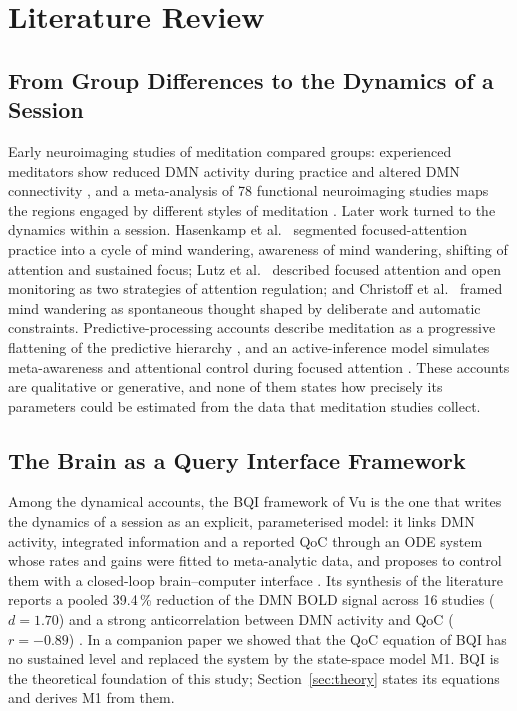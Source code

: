 \section{Literature Review}
\label{sec:litreview}

\subsection{From Group Differences to the Dynamics of a Session}
Early neuroimaging studies of meditation compared groups: experienced meditators show reduced DMN activity during practice and altered DMN connectivity \cite{Brewer2011,Garrison2015}, and a meta-analysis of 78 functional neuroimaging studies maps the regions engaged by different styles of meditation \cite{Fox2016}. Later work turned to the dynamics within a session. Hasenkamp et al.\ \cite{Hasenkamp2012} segmented focused-attention practice into a cycle of mind wandering, awareness of mind wandering, shifting of attention and sustained focus; Lutz et al.\ \cite{Lutz2008} described focused attention and open monitoring as two strategies of attention regulation; and Christoff et al.\ \cite{Christoff2016} framed mind wandering as spontaneous thought shaped by deliberate and automatic constraints. Predictive-processing accounts describe meditation as a progressive flattening of the predictive hierarchy \cite{Laukkonen2021}, and an active-inference model simulates meta-awareness and attentional control during focused attention \cite{SandvedSmith2021}. These accounts are qualitative or generative, and none of them states how precisely its parameters could be estimated from the data that meditation studies collect.

\subsection{The Brain as a Query Interface Framework}
Among the dynamical accounts, the BQI framework of Vu \cite{BQI} is the one that writes the dynamics of a session as an explicit, parameterised model: it links DMN activity, integrated information and a reported QoC through an ODE system whose rates and gains were fitted to meta-analytic data, and proposes to control them with a closed-loop brain--computer interface \cite[Sec.~7, 9 and 10]{BQI}. Its synthesis of the literature reports a pooled 39.4\,\% reduction of the DMN BOLD signal across 16 studies ($d=1.70$) and a strong anticorrelation between DMN activity and QoC ($r=-0.89$) \cite[Sec.~7.3--7.4]{BQI}. In a companion paper \cite{companion} we showed that the QoC equation of BQI has no sustained level and replaced the system by the state-space model M1. BQI is the theoretical foundation of this study; Section~\ref{sec:theory} states its equations and derives M1 from them.

